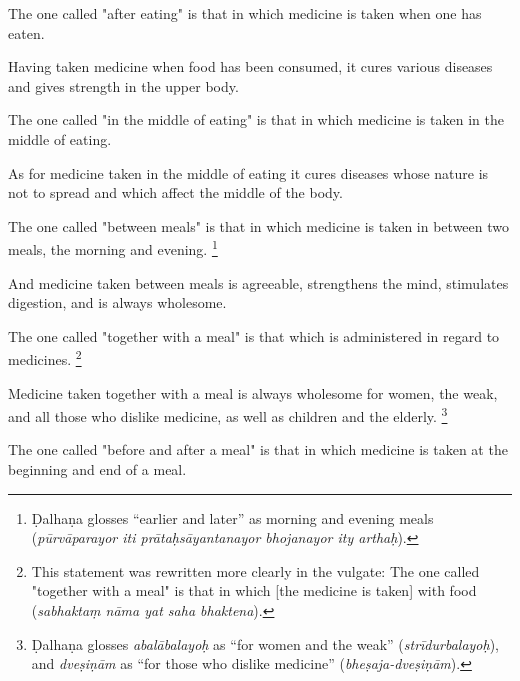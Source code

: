 \begin{translation}
\item[90]
The one called "after eating" is that in which medicine is taken when one has eaten. %

\item[91]
Having taken medicine %
when food has been consumed, %
it %
cures various diseases and gives strength in the upper body. %

\item[92]
The one called "in the middle of eating" is that in which medicine is taken in the middle of eating. %

\item[93]
As for medicine taken in the middle of eating %
it cures %
diseases %
whose nature is not to spread %
and which %
affect the middle of the body. %

\item[94]
The one called "between meals" is that in which medicine is taken in between two meals, the morning and evening.%
    \footnote{Ḍalhaṇa glosses ``earlier and later'' as morning and evening meals (\emph{pūrvāparayor iti prātaḥsāyantanayor bhojanayor ity arthaḥ}). }

\item[95]
And medicine %
taken between meals %
is agreeable, %
strengthens the mind, stimulates digestion, and is always wholesome.

\item[96]
The one called "together with a meal" is that which is administered in regard to medicines.%
    \footnote{This statement was rewritten more clearly in the vulgate: The one called "together with a meal" is that in which [the medicine is taken] with food (\emph{sabhaktaṃ nāma yat saha bhaktena}).}

\item[97]
Medicine taken together with a meal %
is always wholesome for women, %
the weak, %
and all those who dislike medicine, %
as well as children and the elderly.%
    \footnote{Ḍalhaṇa glosses \emph{abalābalayoḥ} as ``for women and the weak'' (\emph{strīdurbalayoḥ}), and \emph{dveṣiṇām} as ``for those who dislike medicine'' (\emph{bheṣaja-dveṣiṇām}).}

\item[98]
The one called "before and after a meal" is that in which medicine is taken at the beginning and end of a meal.


\end{translation}

